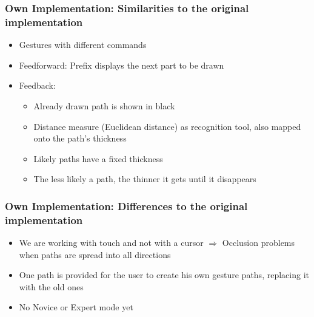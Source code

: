 \documentclass{beamer}
\begin{document}


\begin{frame}
\frametitle{Own Implementation: Similarities to the original implementation}

\begin{itemize}
\item Gestures with different commands
\item Feedforward: Prefix displays the next part to be drawn
\item Feedback: 
	\begin{itemize}
	\item Already drawn path is shown in black 
	\item Distance measure (Euclidean distance) as recognition tool, also mapped onto the path's 				  thickness
	\item Likely paths have a fixed thickness
	\item The less likely a path, the thinner it gets until it disappears
	\end{itemize}



\end{itemize}

\end{frame}


\begin{frame}
\frametitle{Own Implementation: Differences to the original implementation}

\begin{itemize}
\item We are working with touch and not with a cursor \newline $\Rightarrow$ Occlusion problems when paths are spread into all directions
\item One path is provided for the user to create his own gesture paths, replacing it with the old ones 
\item No Novice or Expert mode yet




\end{itemize}

\end{frame}

\end{document}

